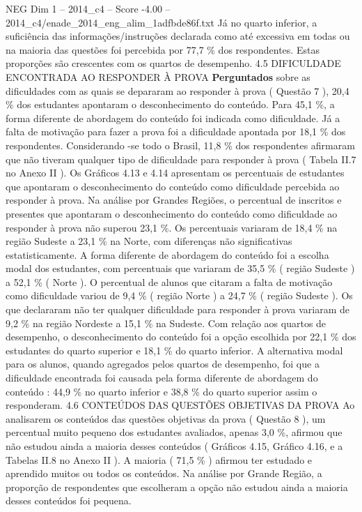 \begin{textsample}{NEG Dim 1 – 2014\_c4 – Score -4.00 – 2014\_c4/enade\_2014\_eng\_alim\_1adfbde86f.txt}
Já no quarto inferior, a suficiência das informações/instruções declarada como até excessiva em todas ou na maioria das questões foi percebida por 77,7 \% dos respondentes.
Estas proporções são crescentes com os quartos de desempenho. 4.5 DIFICULDADE ENCONTRADA AO RESPONDER À PROVA \textbf{Perguntados} sobre as dificuldades com as quais se depararam ao responder à prova ( Questão 7 ), 20,4 \% dos estudantes apontaram o desconhecimento do conteúdo.
Para 45,1 \%, a forma diferente de abordagem do conteúdo foi indicada como dificuldade.
Já a falta de motivação para fazer a prova foi a dificuldade apontada por 18,1 \% dos respondentes.
Considerando -se todo o Brasil, 11,8 \% dos respondentes afirmaram que não tiveram qualquer tipo de dificuldade para responder à prova ( Tabela II.7 no Anexo II ).
Os Gráficos 4.13 e 4.14 apresentam os percentuais de estudantes que apontaram o desconhecimento do conteúdo como dificuldade percebida ao responder à prova.
Na análise por Grandes Regiões, o percentual de inscritos e presentes que apontaram o desconhecimento do conteúdo como dificuldade ao responder à prova não superou 23,1 \%.
Os percentuais variaram de 18,4 \% na região Sudeste a 23,1 \% na Norte, com diferenças não significativas estatisticamente.
A forma diferente de abordagem do conteúdo foi a escolha modal dos estudantes, com percentuais que variaram de 35,5 \% ( região Sudeste ) a 52,1 \% ( Norte ).
O percentual de alunos que citaram a falta de motivação como dificuldade variou de 9,4 \% ( região Norte ) a 24,7 \% ( região Sudeste ).
Os que declararam não ter qualquer dificuldade para responder à prova variaram de 9,2 \% na região Nordeste a 15,1 \% na Sudeste.
Com relação aos quartos de desempenho, o desconhecimento do conteúdo foi a opção escolhida por 22,1 \% dos estudantes do quarto superior e 18,1 \% do quarto inferior.
A alternativa modal para os alunos, quando agregados pelos quartos de desempenho, foi que a dificuldade encontrada foi causada pela forma diferente de abordagem do conteúdo : 44,9 \% no quarto inferior e 38,8 \% do quarto superior assim o responderam. 4.6 CONTEÚDOS DAS QUESTÕES OBJETIVAS DA PROVA Ao analisarem os conteúdos das questões objetivas da prova ( Questão 8 ), um percentual muito pequeno dos estudantes avaliados, apenas 3,0 \%, afirmou que não estudou ainda a maioria desses conteúdos ( Gráficos 4.15, Gráfico 4.16, e a Tabelas II.8 no Anexo II ).
A maioria ( 71,5 \% ) afirmou ter estudado e aprendido muitos ou todos os conteúdos.
Na análise por Grande Região, a proporção de respondentes que escolheram a opção não estudou ainda a maioria desses conteúdos foi pequena.

\end{textsample}
